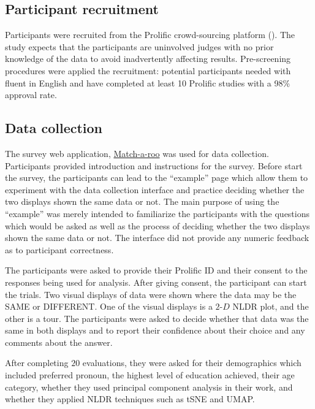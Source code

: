 \documentclass[
  11pt,
  a4paper,
]{report}
\newcommand\gD{$2\text{-}D$}
\begin{document}
\subsection{Participant recruitment}\label{participant-recruitment}

Participants were recruited from the Prolific crowd-sourcing platform
(). The study expects that
the participants are uninvolved judges with no prior knowledge of the
data to avoid inadvertently affecting results. Pre-screening procedures
were applied the recruitment: potential participants needed with fluent
in English and have completed at least 10 Prolific studies with a 98\%
approval rate.

\subsection{Data collection}\label{data-collection}

The survey web application,
\href{https://ebsmonash.shinyapps.io/web_game/}{Match-a-roo} was used
for data collection. Participants provided introduction and instructions
for the survey. Before start the survey, the participants can lead to
the ``example'' page which allow them to experiment with the data
collection interface and practice deciding whether the two displays
shown the same data or not. The main purpose of using the ``example''
was merely intended to familiarize the participants with the questions
which would be asked as well as the process of deciding whether the two
displays shown the same data or not. The interface did not provide any
numeric feedback as to participant correctness.

The participants were asked to provide their Prolific ID and their
consent to the responses being used for analysis. After giving consent,
the participant can start the trials. Two visual displays of data were
shown where the data may be the SAME or DIFFERENT. One of the visual
displays is a \gD{} NLDR plot, and the other is a tour. The participants
were asked to decide whether that data was the same in both displays and
to report their confidence about their choice and any comments about the
answer.

After completing \(20\) evaluations, they were asked for their
demographics which included preferred pronoun, the highest level of
education achieved, their age category, whether they used principal
component analysis in their work, and whether they applied NLDR
techniques such as tSNE and UMAP.
\end{document}
